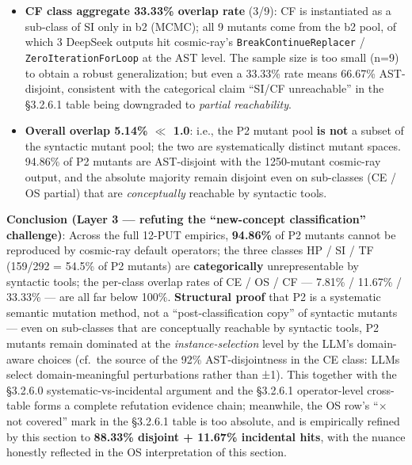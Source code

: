 \documentclass[review,12pt,authoryear]{elsarticle}
\begin{document}
\begin{itemize}
  OS1 by the P2 LLM because the rewrite is semantically equivalent on
  the PUT). This is the empirical confirmation of the §3.2.6.0
  systematic-vs-incidental argument: \textbf{incidental hits by
  syntactic tools on the cross-function-boundary condition (a) are
  non-zero-probability events}. But the OS class's overall 88.33\%
  AST-disjointness still systematically rules out an ``OS = AST-local''
  classification.
\item
  \textbf{CF class aggregate 33.33\% overlap rate} (3/9): CF is
  instantiated as a sub-class of SI only in b2 (MCMC); all 9 mutants
  come from the b2 pool, of which 3 DeepSeek outputs hit cosmic-ray's
  \texttt{BreakContinueReplacer} / \texttt{ZeroIterationForLoop} at the
  AST level. The sample size is too small (n=9) to obtain a robust
  generalization; but even a 33.33\% rate means 66.67\% AST-disjoint,
  consistent with the categorical claim ``SI/CF unreachable'' in the
  §3.2.6.1 table being downgraded to \emph{partial reachability}.
\item
  \textbf{Overall overlap 5.14\% $\ll$ 1.0}: i.e., the P2 mutant pool
  \textbf{is not} a subset of the syntactic mutant pool; the two are
  systematically distinct mutant spaces. 94.86\% of P2 mutants are
  AST-disjoint with the 1250-mutant cosmic-ray output, and the absolute
  majority remain disjoint even on sub-classes (CE / OS partial) that
  are \emph{conceptually} reachable by syntactic tools.
\end{itemize}

\textbf{Conclusion (Layer 3 --- refuting the ``new-concept
classification'' challenge)}: Across the full 12-PUT empirics,
\textbf{94.86\%} of P2 mutants cannot be reproduced by cosmic-ray
default operators; the three classes HP / SI / TF (159/292 = 54.5\% of
P2 mutants) are \textbf{categorically} unrepresentable by syntactic
tools; the per-class overlap rates of CE / OS / CF --- 7.81\% / 11.67\%
/ 33.33\% --- are all far below 100\%. \textbf{Structural proof} that P2
is a systematic semantic mutation method, not a ``post-classification
copy'' of syntactic mutants --- even on sub-classes that are
conceptually reachable by syntactic tools, P2 mutants remain dominated
at the \emph{instance-selection} level by the LLM's domain-aware choices
(cf.~the source of the 92\% AST-disjointness in the CE class: LLMs
select domain-meaningful perturbations rather than ±1). This together
with the §3.2.6.0 systematic-vs-incidental argument and the §3.2.6.1
operator-level cross-table forms a complete refutation evidence chain;
meanwhile, the OS row's ``$\times$ not covered'' mark in the §3.2.6.1 table is
too absolute, and is empirically refined by this section to
\textbf{88.33\% disjoint + 11.67\% incidental hits}, with the nuance
honestly reflected in the OS interpretation of this section.
\end{document}
